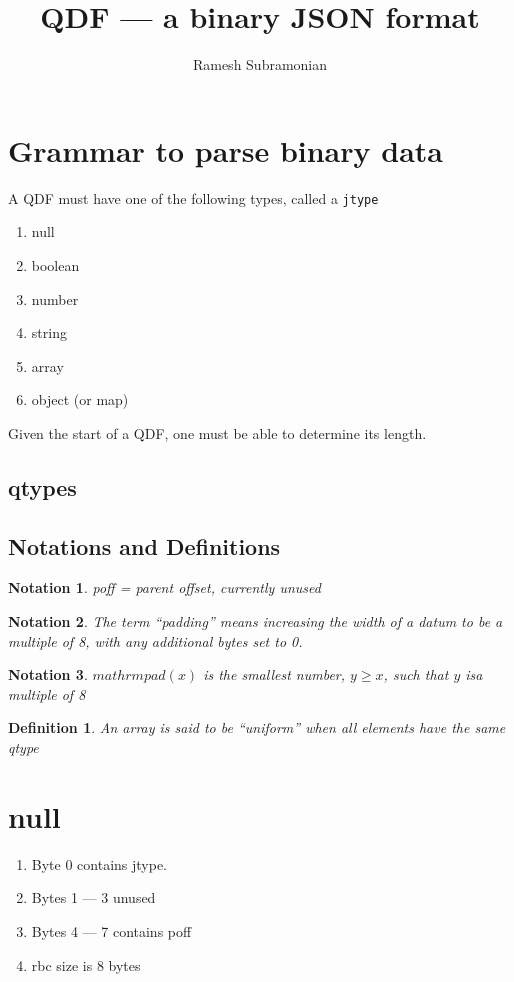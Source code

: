 \documentclass[letterpaper,12pt]{article}
\newcommand{\TBC}{\framebox{\textbf{TO BE COMPLETED}}}
\newcommand{\be}{\begin{enumerate}}
\newcommand{\ee}{\end{enumerate}}
\newtheorem{notation}{Notation}
\newtheorem{definition}{Definition}
\begin{document}
\title{QDF --- a binary JSON format}
\author{Ramesh Subramonian }
\maketitle
\thispagestyle{fancy}
\lhead{}
\chead{}
\rhead{}
\cfoot{}
\rfoot{{\small \thepage}}


\section{Grammar to parse binary data}

A QDF must have one of the following types, called a {\tt jtype}
\be
\item null
\item boolean
\item number
\item string
\item array
\item object (or map)
  \ee

Given the start of a QDF, one must be able to determine its length.
\subsection{qtypes}
\label{qtypes}


\subsection{Notations and Definitions}
\begin{notation}
poff = parent offset, currently unused \TBC
\end{notation}

\begin{notation}
The term ``padding'' means increasing the width of a datum to be a multiple of 8,
  with any additional bytes set to 0.
\end{notation}
\begin{notation}
  \(mathrm{pad}(x)\) is the smallest number, \(y \geq x\), such that \(y\) isa
  multiple of 8
\end{notation}
\begin{definition}
An array is said to be ``uniform'' when all elements have the same qtype
\end{definition}

\section{null}
\be
\item Byte 0   contains jtype.
\item Bytes 1 --- 3  unused
\item Bytes 4 --- 7  contains poff
\item rbc size is 8 bytes 
  \ee
\end{document}
